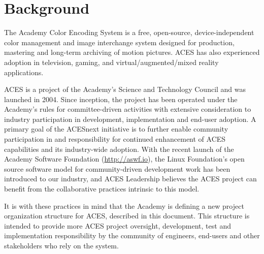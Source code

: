 \numberedformat
\chapter{Background}

The Academy Color Encoding System is a free, open-source, device-independent color management and image interchange system designed for production, mastering and long-term archiving of motion pictures. ACES has also experienced adoption in television, gaming, and virtual/augmented/mixed reality applications.

ACES is a project of the Academy's Science and Technology Council and was launched in 2004. Since inception, the project has been operated under the Academy’s rules for committee-driven activities with extensive consideration to industry participation in development, implementation and end-user adoption. A primary goal of the ACESnext initiative is to further enable community participation in and responsibility for continued enhancement of ACES capabilities and its industry-wide adoption. With the recent launch of the Academy Software Foundation (\href{http://aswf.io}{http://aswf.io}), the Linux Foundation's open source software model for community-driven development work has been introduced to our industry, and ACES Leadership believes the ACES project can benefit from the collaborative practices intrinsic to this model.

It is with these practices  in mind that the Academy is defining a new project organization structure for ACES, described in this document. This structure is intended to provide more ACES project oversight, development, test and implementation responsibility by the community of engineers, end-users and other stakeholders who rely on the system.